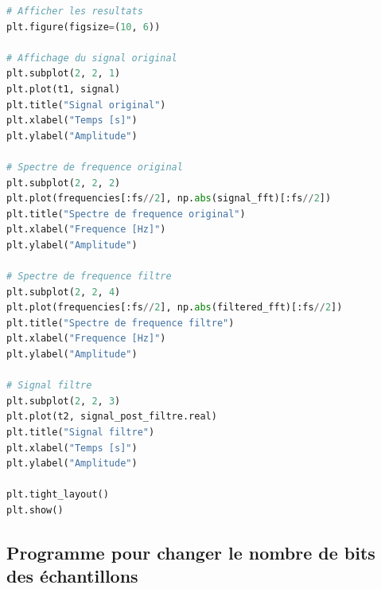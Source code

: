 \documentclass[11pt,letterpaper]{article}
\begin{document}
\begin{lstlisting}[language=python]
# Afficher les resultats
plt.figure(figsize=(10, 6))

# Affichage du signal original
plt.subplot(2, 2, 1)
plt.plot(t1, signal)
plt.title("Signal original")
plt.xlabel("Temps [s]")
plt.ylabel("Amplitude")

# Spectre de frequence original
plt.subplot(2, 2, 2)
plt.plot(frequencies[:fs//2], np.abs(signal_fft)[:fs//2])
plt.title("Spectre de frequence original")
plt.xlabel("Frequence [Hz]")
plt.ylabel("Amplitude")

# Spectre de frequence filtre
plt.subplot(2, 2, 4)
plt.plot(frequencies[:fs//2], np.abs(filtered_fft)[:fs//2])
plt.title("Spectre de frequence filtre")
plt.xlabel("Frequence [Hz]")
plt.ylabel("Amplitude")

# Signal filtre
plt.subplot(2, 2, 3)
plt.plot(t2, signal_post_filtre.real)
plt.title("Signal filtre")
plt.xlabel("Temps [s]")
plt.ylabel("Amplitude")

plt.tight_layout()
plt.show()
\end{lstlisting}

\subsection{Programme pour changer le nombre de bits des échantillons}
\end{document}
